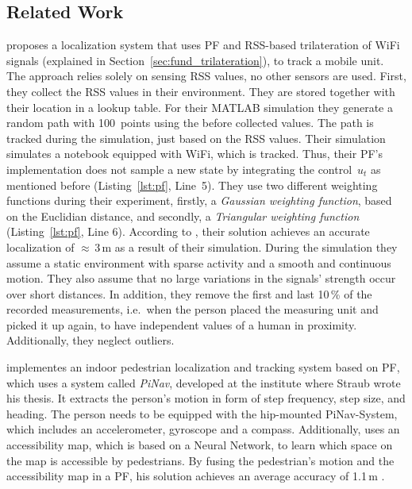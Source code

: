 \subsection{Related Work}

\citet{Siddiqui:tracking} proposes a localization system that uses \ac{PF} and \acs{RSS}-based trilateration of WiFi signals (explained in Section~\ref{sec:fund_trilateration}), to track a mobile unit. The approach relies solely on sensing \ac{RSS} values, no other sensors are used. First, they collect the \ac{RSS} values in their environment. They are stored together with their location in a lookup table. For their MATLAB simulation they generate a random path with 100~points using the before collected values. The path is tracked during the simulation, just based on the \ac{RSS} values. Their simulation simulates a notebook equipped with WiFi, which is tracked. Thus, their \ac{PF}'s implementation does not sample a new state by integrating the control~$u_t$ as mentioned before (Listing~\ref{lst:pf}, Line~5). They use two different weighting functions during their experiment, firstly, a \emph{Gaussian weighting function}, based on the Euclidian distance, and secondly, a \emph{Triangular weighting function} (Listing~\ref{lst:pf}, Line 6). According to \citet{Siddiqui:tracking}, their solution achieves an accurate localization of $\approx$\,3\,m as a result of their simulation. During the simulation they assume a static environment with sparse activity and a smooth and continuous motion. They also assume that no large variations in the signals' strength occur over short distances. In addition, they remove the first and last 10\,\% of the recorded measurements, i.e.\ when the person placed the measuring unit and picked it up again, to have independent values of a human in proximity. Additionally, they neglect outliers.

\citet{straub:pf} implementes an indoor pedestrian localization and tracking system based on \ac{PF}, which uses a system called \emph{PiNav}, developed at the institute where Straub wrote his thesis. It extracts the person's motion in form of step frequency, step size, and heading. The person needs to be equipped with the hip-mounted PiNav-System, which includes an accelerometer, gyroscope and a compass. Additionally, \citet{straub:pf} uses an accessibility map, which is based on a Neural Network, to learn which space on the map is accessible by pedestrians. By fusing the pedestrian's motion and the accessibility map in a \ac{PF}, his solution achieves an average accuracy of 1.1\,m \citep{straub:pf}.

